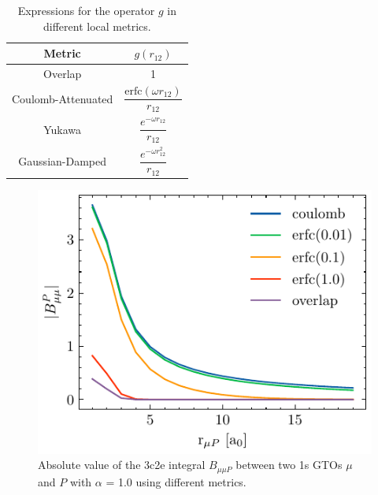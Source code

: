\begin{table}
\centering
\begin{tabular}{cc}
\hline
Metric & $g(r_{12})$ \\ \hline
\multirow{2}{*}{Overlap \cite{Bae1973}} & \multirow{2}{*}{1} \\ & \\
\multirow{3}{*}{Coulomb-Attenuated \cite{Jun2005}} & \multirow{3}{*}{$\dfrac{\mathrm{erfc}(\omega r_{12})}{r_{12}}$} \\ & \\ & \\
\multirow{3}{*}{Yukawa \cite{Gil2005}} & \multirow{3}{*}{$\dfrac{e^{-\omega r_{12}}}{r_{12}}$} \\ & \\ & \\
\multirow{3}{*}{Gaussian-Damped \cite{Rei2008}} & \multirow{3}{*}{$\dfrac{e^{-\omega r_{12}^2}}{r_{12}}$} \\ & \\ & \\ \hline
\end{tabular}
\caption{Expressions for the operator $g$ in different local metrics.}
\label{tab:DFMETRICS}
\end{table}

\begin{figure}
\centering
\includegraphics[scale=1.0]{Pics/ldf.pdf}
\caption{Absolute value of the 3c2e integral $B_{\mu\mu P}$ between two 1s GTOs $\mu$ and $P$ with $\alpha$ = 1.0 using different metrics.}
\label{fig:DFMETRICS}
\end{figure}

